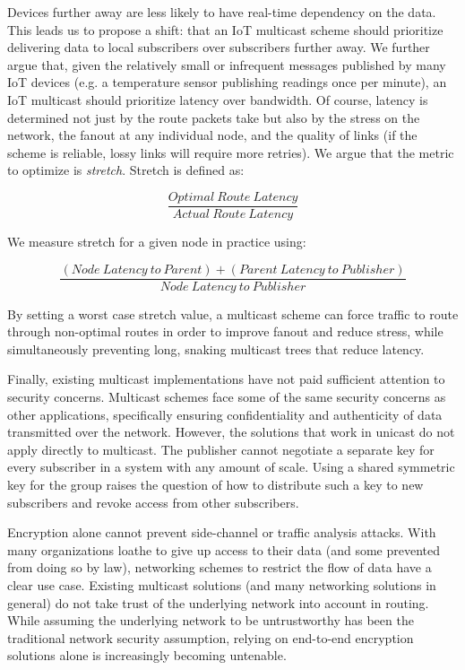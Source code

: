 Devices further away are less likely to have real-time dependency on the data. This leads us to propose a shift: that an IoT multicast scheme should prioritize delivering data to local subscribers over subscribers further away. We further argue that, given the relatively small or infrequent messages published by many IoT devices (e.g. a temperature sensor publishing readings once per minute), an IoT multicast should prioritize latency over bandwidth. Of course, latency is determined not just by the route packets take but also by the stress on the network, the fanout at any individual node, and the quality of links (if the scheme is reliable, lossy links will require more retries). We argue that the metric to optimize is \textit{stretch}. Stretch is defined as:

\[\frac{Optimal\: Route\: Latency}{Actual\: Route\: Latency}\]

We measure stretch for a given node in practice using:

\[\frac{(Node\: Latency\: to\: Parent) + (Parent\: Latency\: to\: Publisher)}{Node\: Latency\: to\: Publisher}\]

By setting a worst case stretch value, a multicast scheme can force traffic to route through non-optimal routes in order to improve fanout and reduce stress, while simultaneously preventing long, snaking multicast trees that reduce latency.

Finally, existing multicast implementations have not paid sufficient attention to security concerns. Multicast schemes face some of the same security concerns as other applications, specifically ensuring confidentiality and authenticity of data transmitted over the network. However, the solutions that work in unicast do not apply directly to multicast. The publisher cannot negotiate a separate key for every subscriber in a system with any amount of scale.  Using a shared symmetric key for the group raises the question of how to distribute such a key to new subscribers and revoke access from other subscribers. 

Encryption alone cannot prevent side-channel or traffic analysis attacks. With many organizations loathe to give up access to their data (and some prevented from doing so by law), networking schemes to restrict the flow of data have a clear use case. Existing multicast solutions (and many networking solutions in general) do not take trust of the underlying network into account in routing. While assuming the underlying network to be untrustworthy has been the traditional network security assumption, relying on end-to-end encryption solutions alone is increasingly becoming untenable.


